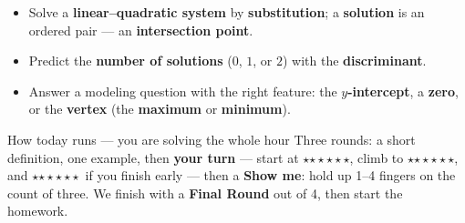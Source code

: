 \documentclass[aspectratio=169, 11pt]{beamer}
\newcommand{\rung}[1]{{\color{goldacc}\ifcase#1\or$\star$\or$\star\star$\or$\star\star\star$\fi}}
\begin{document}
\begin{frame}[t, plain]
  \begin{itemize}\setlength{\itemsep}{4pt}
    \item Solve a \textbf{linear--quadratic system} by \textbf{substitution}; a \textbf{solution}
          is an ordered pair --- an \textbf{intersection point}.
    \item Predict the \textbf{number of solutions} ($0$, $1$, or $2$) with the
          \textbf{discriminant}.
    \item Answer a modeling question with the right feature: the \textbf{$y$-intercept}, a
          \textbf{zero}, or the \textbf{vertex} (the \textbf{maximum} or \textbf{minimum}).
  \end{itemize}
  \vspace{3pt}
  \begin{block}{How today runs --- you are solving the whole hour}
    Three rounds: a short definition, one example, then \textbf{your turn} --- start at
    \rung1, climb to \rung2, and \rung3\ if you finish early --- then a \textbf{Show me}: hold up
    1--4 fingers on the count of three. We finish with a \textbf{Final Round} out of 4, then
    start the homework.
  \end{block}
\end{frame}
\end{document}
